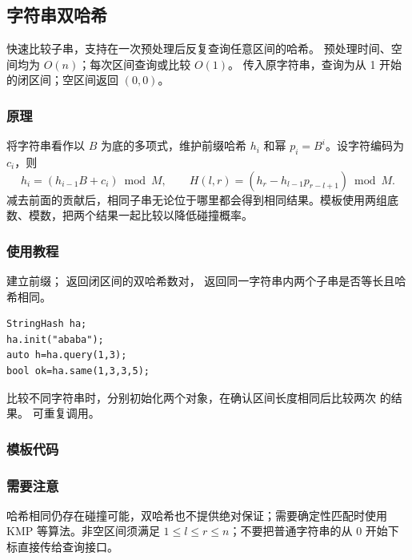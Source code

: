 \subsection{字符串双哈希}
\label{algo:string-hash}
\AlgorithmInfo
    {快速比较子串，支持在一次预处理后反复查询任意区间的哈希。}
    {预处理时间、空间均为 $O(n)$；每次区间查询或比较 $O(1)$。}
    {传入原字符串，查询为从 1 开始的闭区间；空区间返回 $(0,0)$。}

\subsubsection*{原理}
将字符串看作以 $B$ 为底的多项式，维护前缀哈希 $h_i$ 和幂 $p_i=B^i$。设字符编码为 $c_i$，则
\[
    h_i=(h_{i-1}B+c_i)\bmod M,\qquad
    H(l,r)=(h_r-h_{l-1}p_{r-l+1})\bmod M.
\]
减去前面的贡献后，相同子串无论位于哪里都会得到相同结果。模板使用两组底数、模数，把两个结果一起比较以降低碰撞概率。

\subsubsection*{使用教程}
 建立前缀； 返回闭区间的双哈希数对， 返回同一字符串内两个子串是否等长且哈希相同。
\begin{lstlisting}[style=mtycpp,numbers=none]
StringHash ha;
ha.init("ababa");
auto h=ha.query(1,3);
bool ok=ha.same(1,3,3,5);
\end{lstlisting}
比较不同字符串时，分别初始化两个对象，在确认区间长度相同后比较两次  的结果。 可重复调用。

\subsubsection*{模板代码}

\subsubsection*{需要注意}
哈希相同仍存在碰撞可能，双哈希也不提供绝对保证；需要确定性匹配时使用 KMP 等算法。非空区间须满足 $1\leq l\leq r\leq n$；不要把普通字符串的从 0 开始下标直接传给查询接口。
